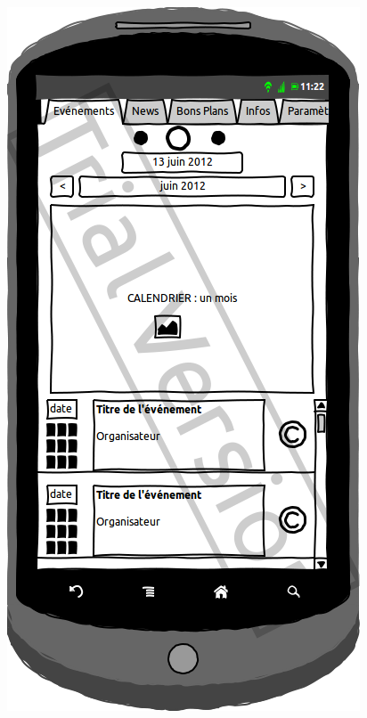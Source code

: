 \documentclass[a4paper, 11px]{article}
\begin{document}
\begin{figure}[htbp]
	\begin{minipage}[c]{.50\linewidth}
		\begin{center}
			\includegraphics[scale=0.3]{../../Sketch/Android/Calendrier.png}
		\end{center}
	\end{minipage}
	\hfill
	\begin{minipage}[c]{.50\linewidth}
		\begin{center}

\end{center}
\end{minipage}
\end{figure}
\end{document}
